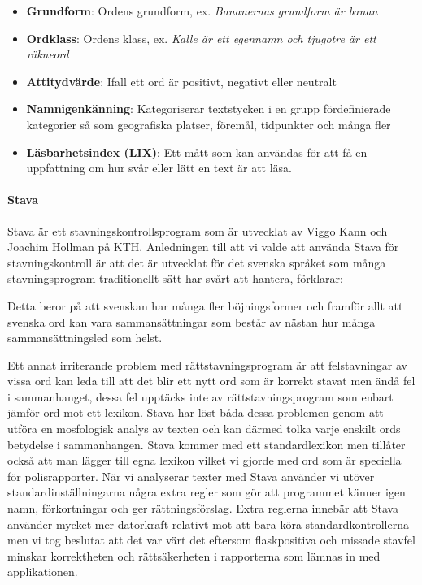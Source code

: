\documentclass[swedish]{maucsthesis}
\begin{document}
\begin{itemize}
\item \textbf{Grundform}: Ordens grundform, ex. \textit{Bananernas grundform är
    banan}
\item \textbf{Ordklass}: Ordens klass, ex. \textit{Kalle är ett egennamn och
    tjugotre är ett räkneord}
\item \textbf{Attitydvärde}: Ifall ett ord är positivt, negativt eller neutralt
\item \textbf{Namnigenkänning}: Kategoriserar textstycken i en grupp
  fördefinierade kategorier så som geografiska platser, föremål, tidpunkter och
  många fler
\item \textbf{Läsbarhetsindex (LIX)}: Ett mått som kan användas för att få en
  uppfattning om hur svår eller lätt en text är att läsa.
\end{itemize}

\paragraph{Stava}
Stava är ett stavningskontrollsprogram som är utvecklat av Viggo Kann och
Joachim Hollman på KTH. Anledningen till att vi valde att använda Stava för
stavningskontroll är att det är utvecklat för det svenska språket som många
stavningsprogram traditionellt sätt har svårt att hantera, \cite{kann:1997}
förklarar:

\begin{displayquote}
  Detta beror på att svenskan har många fler böjningsformer och framför allt att
  svenska ord kan vara sammansättningar som består av nästan hur många
  sammansättningsled som helst.
\end{displayquote}

Ett annat irriterande problem med rättstavningsprogram är att felstavningar av
vissa ord kan leda till att det blir ett nytt ord som är korrekt stavat men ändå
fel i sammanhanget, dessa fel upptäcks inte av rättstavningsprogram som
enbart jämför ord mot ett lexikon. Stava har löst båda dessa problemen genom att
utföra en mosfologisk analys av texten och kan därmed tolka varje enskilt ords
betydelse i sammanhangen. Stava kommer med ett standardlexikon men tillåter
också att man lägger till egna lexikon vilket vi gjorde med ord som är speciella
för polisrapporter. När vi analyserar texter med Stava använder vi utöver
standardinställningarna några extra regler som gör att programmet känner igen
namn, förkortningar och ger rättningsförslag. Extra reglerna innebär att Stava
använder mycket mer datorkraft relativt mot att bara köra standardkontrollerna
men vi tog beslutat att det var värt det eftersom flaskpositiva och missade
stavfel minskar korrektheten och rättsäkerheten i rapporterna som lämnas in med
applikationen.
\end{document}
